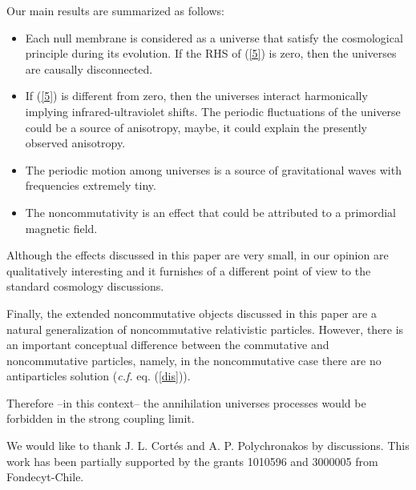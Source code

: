 \documentclass[a4paper,aps,twocolumn,amsfonts]{revtex4}
\begin{document}
   Our main results are summarized as follows:
   \begin{itemize}
   \item{}Each null membrane is considered as a universe that satisfy the cosmological principle during its evolution.  If the RHS of (\ref{5}) is zero, then the universes are causally disconnected.

   \item{}If (\ref{5}) is different from zero, then the universes interact harmonically implying infrared-ultraviolet shifts. The periodic fluctuations of the universe could be a source of anisotropy, maybe, it could explain the presently observed anisotropy.

   \item{}The periodic motion among universes is a source of gravitational waves with frequencies extremely tiny. 
   
    \item{} The noncommutativity is an effect that could be attributed to a primordial magnetic field. 
   \end{itemize}
   
   Although the effects discussed in this paper are very small, in our opinion are qualitatively interesting and it furnishes of a different point of view to the standard cosmology discussions.

Finally, the extended noncommutative objects discussed in this paper are a natural generalization of noncommutative relativistic particles. However, there is an important conceptual difference between the commutative and noncommutative particles, namely, in the noncommutative case there are no antiparticles solution ({\it c.f.} eq. (\ref{dis})). 

Therefore --in this context-- the annihilation universes processes would be forbidden in the strong coupling limit. 

\acknowledgments 
We would like to thank  J. L. Cort\'es and A. P. Polychronakos by discussions. This work has been partially supported by the grants 1010596 and 3000005 from Fondecyt-Chile.
\end{document}
